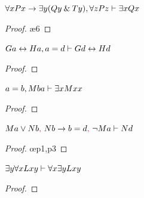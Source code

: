 \begin{earg}
\noindent\begin{minipage}{0.99\textwidth}
\item $\forall xPx \rightarrow \exists y(Qy \mathbin{\&} Ty), \forall zPz \vdash \exists xQx$

\begin{proof}
	 \pr{}
	 \pr{}
	 
	 
	 
	\open
		 \as{}
		 \ae{6}
		 
	\close
{} 
\end{proof}
\bigskip
\end{minipage}



\item $Ga \leftrightarrow Ha, a=d \vdash Gd \leftrightarrow Hd$

\begin{proof}
	 \pr{}
	 \pr{}
	 
\end{proof}
\bigskip

\noindent\begin{minipage}{0.99\textwidth}
\item $a=b, Mba \vdash \exists xMxx$

\begin{proof}
	 \pr{}
	 \pr{}
	 
	 
\end{proof}
\smallskip
\end{minipage}

\noindent\begin{minipage}{0.99\textwidth}
\item $Ma \vee Nb\textcolor{magenta}{,}~ Nb \rightarrow b=d\textcolor{magenta}{,}~ {\neg} Ma  \vdash Nd$

\begin{proof}
	 \pr{}
	 \pr{}
	 \pr{}
	 \oe{p1,p3}
	 
	 
\end{proof}
\medskip
\end{minipage}



\noindent\begin{minipage}{0.99\textwidth}
\item $\exists y \forall xLxy \vdash \forall x \exists yLxy$

\begin{proof}
	 \pr{}
	\open
		 \as{}
		 
		 
		 
	\close
	 
\end{proof}
\end{minipage}
\end{earg}  %
